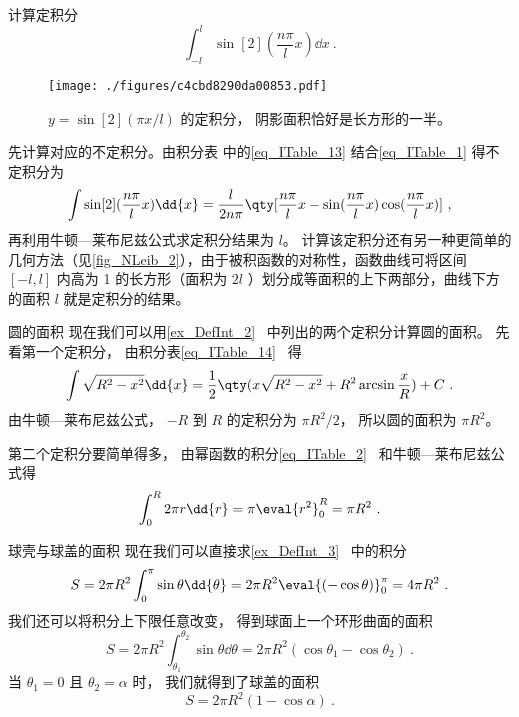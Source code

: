 \begin{example}{计算定积分}
\begin{equation}
\int_{-l}^l \sin[2](\frac{n\pi}{l} x) \dd{x}~.
\end{equation}

\begin{figure}[ht]
\centering
\texttt{[image: ./figures/c4cbd8290da00853.pdf]}
\caption{$y = \sin[2](\pi x/l)$ 的定积分， 阴影面积恰好是长方形的一半。}\label{fig_NLeib_2}
\end{figure}

先计算对应的不定积分。由积分表 中的\autoref{eq_ITable_13} 结合\autoref{eq_ITable_1} 得不定积分为
\begin{equation}
\int\sin[2](\frac{n\pi}{l} x) \dd{x} = \frac{l}{2n\pi} \qty[\frac{n\pi}{l} x - \sin(\frac{n\pi}{l} x)\cos(\frac{n\pi}{l} x)]~,
\end{equation}
再利用牛顿—莱布尼兹公式求定积分结果为 $l$。 计算该定积分还有另一种更简单的几何方法（见\autoref{fig_NLeib_2}），由于被积函数的对称性，函数曲线可将区间 $[-l,l]$ 内高为 1 的长方形（面积为 $2l$ ）划分成等面积的上下两部分，曲线下方的面积 $l$ 就是定积分的结果。
\end{example}

\begin{example}{圆的面积}\label{ex_NLeib_2}
现在我们可以用\autoref{ex_DefInt_2}~ 中列出的两个定积分计算圆的面积。 先看第一个定积分， 由积分表\autoref{eq_ITable_14}~ 得
\begin{equation}
\int \sqrt{R^2 - x^2} \dd{x} = \frac12 \qty(x\sqrt{R^2 - x^2} + R^2\arcsin\frac{x}{R}) + C~.
\end{equation}
由牛顿—莱布尼兹公式， $-R$ 到 $R$ 的定积分为 $\pi R^2/2$， 所以圆的面积为 $\pi R^2$。

第二个定积分要简单得多， 由幂函数的积分\autoref{eq_ITable_2}~ 和牛顿—莱布尼兹公式得
\begin{equation}
\int_0^R 2\pi r \dd{r} = \pi \eval{r^2}_0^R = \pi R^2~.
\end{equation}
\end{example}

\begin{example}{球壳与球盖的面积}\label{ex_NLeib_3}
现在我们可以直接求\autoref{ex_DefInt_3}~ 中的积分
\begin{equation}
S = 2\pi R^2 \int_0^{\pi} \sin\theta \dd{\theta} = 2\pi R^2 \eval{(-\cos\theta)}_0^\pi = 4\pi R^2~.
\end{equation}
我们还可以将积分上下限任意改变， 得到球面上一个环形曲面的面积
\begin{equation}
S = 2\pi R^2 \int_{\theta_1}^{\theta_2} \sin\theta \dd{\theta} = 2\pi R^2 (\cos{\theta_1} - \cos{\theta_2})~.
\end{equation}
当 $\theta_1 = 0$ 且 $\theta_2 = \alpha$ 时， 我们就得到了球盖的面积
\begin{equation}
S = 2\pi R^2 (1 - \cos\alpha)~.
\end{equation}
\end{example}

